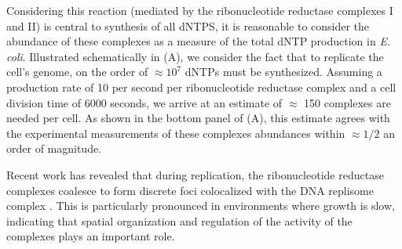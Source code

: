 Considering this reaction (mediated by the ribonucleotide reductase complexes I
and II) is central to synthesis of all dNTPS, it is reasonable to consider the
abundance of these complexes as a measure of the total dNTP production in
\textit{E. coli}. Illustrated schematically in  (A), we
consider the fact that to replicate the cell's genome, on the order of $\approx
10^7$ dNTPs must be synthesized. Assuming a production rate of 10 per second per
ribonucleotide reductase complex and a cell division time of 6000 seconds, we
arrive at an estimate of $\approx$ 150 complexes are needed per cell. As shown
in the bottom panel of  (A), this estimate agrees with the
experimental measurements of these complexes abundances within $\approx 1/2$ an
order of magnitude. 

Recent work has revealed that during replication, the ribonucleotide reductase complexes
coalesce to form discrete foci colocalized with the DNA replisome complex
\citep{sanchez-romero2011}. This is particularly pronounced in environments
where growth is slow, indicating that spatial organization and regulation of the
activity of the complexes plays an important role. 

\begin{figure} 
    \begin{fullwidth} 
\end{fullwidth} 
\end{figure}



